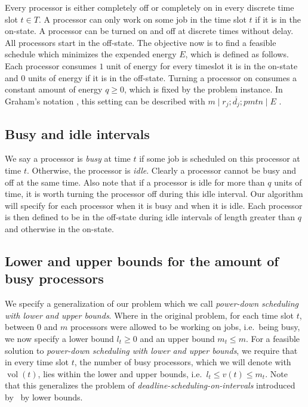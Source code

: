 \documentclass[a4paper]{article}
\DeclareMathOperator{\vol}{vol}
\begin{document}
Every processor is either completely off or completely on in every discrete time slot $t \in T$.
A processor can only work on some job in the time slot $t$ if it is in the on-state.
A processor can be turned on and off at discrete times without delay.
All processors start in the off-state.
The objective now is to find a feasible schedule which minimizes the expended energy $E$, which is defined as follows.
Each processor consumes $1$ unit of energy for every timeslot it is in the on-state and $0$ units of energy if it is in the off-state.
Turning a processor on consumes a constant amount of energy $q \geq 0$, which is fixed by the problem instance.
In Graham's notation \citep{graham}, this setting can be described with $m \mid r_j; \overline{d_j}; pmtn \mid E$ .

\subsection{Busy and idle intervals}
We say a processor is \emph{busy} at time $t$ if some job is scheduled on this processor at time $t$.
Otherwise, the processor is \emph{idle}.
Clearly a processor cannot be busy and off at the same time.
Also note that if a processor is idle for more than $q$ units of time, it is worth turning the processor off during this idle interval.
Our algorithm will specify for each processor when it is busy and when it is idle.
Each processor is then defined to be in the off-state during idle intervals of length greater than $q$ and otherwise in the on-state.

\subsection{Lower and upper bounds for the amount of busy processors}
We specify a generalization of our problem which we call \emph{power-down scheduling with lower and upper bounds}.
Where in the original problem, for each time slot $t$, between $0$ and $m$ processors were allowed to be working on jobs, i.e.\ being busy, we now specify a lower bound $l_t \geq 0$ and an upper bound $m_t \leq m$.
For a feasible solution to \emph{power-down scheduling with lower and upper bounds}, we require that in every time slot $t$, the number of busy processors, which we will denote with $\vol(t)$, lies within the lower and upper bounds, i.e.\ $l_t \leq v(t) \leq m_t$.
Note that this generalizes the problem of \emph{deadline-scheduling-on-intervals} introduced by~\cite{antoniadis} by lower bounds.
\end{document}
